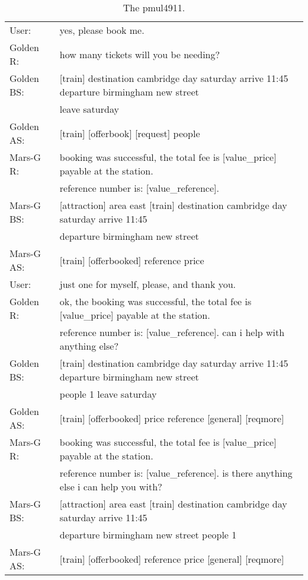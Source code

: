 \begin{table*}[ht]
{\begin{tabular}{ll}
  	\midrule
 User:  & yes, please book me.	\\
  	Golden R: &  how many tickets will you be needing?\\
  	Golden BS: &  [train] destination cambridge day saturday arrive 11:45 departure birmingham new street \\&leave saturday\\
Golden AS:& [train] [offerbook] [request] people      \\
  	  Mars-G R: & booking was successful, the total fee is [value\_price] payable at the station.\\& reference number is: [value\_reference].\\
  	 Mars-G BS: & {\color{red}[attraction] area east} [train] destination cambridge day saturday arrive 11:45 \\&departure birmingham new street\\
  Mars-G AS:&   [train] [offerbooked] reference price   \\
           
  	 
  	 	\midrule
  	 	User:   &just one for myself, please, and thank you.\\
  	 	  Golden R: & ok, the booking was successful, the total fee is [value\_price] payable at the station.\\& reference number is: [value\_reference]. can i help with anything else?\\
  	 	 	Golden BS:  &  [train] destination cambridge day saturday arrive 11:45 departure birmingham new street \\&people 1 leave saturday\\
  	 	 	Golden AS:&    [train] [offerbooked] price reference [general] [reqmore]  \\
  	 	     Mars-G R: & booking was successful, the total fee is [value\_price] payable at the station. \\&reference number is: [value\_reference]. is there anything else i can help you with?\\
  	 	 Mars-G BS: & {\color{red}[attraction] area east} [train] destination cambridge day saturday arrive 11:45 \\&departure birmingham new street people 1 \\
  Mars-G AS:&    [train] [offerbooked] reference price [general] [reqmore]  \\
    
		\bottomrule
	\end{tabular}}\caption{The pmul4911.\label{tab:case4}}
\end{table*}
\fi

